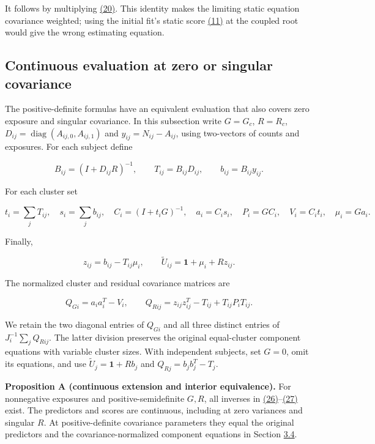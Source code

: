 \documentclass[11pt]{article}
\begin{document}
It follows by multiplying \hyperref[eq:20]{(20)}. This identity makes the limiting static equation covariance weighted; using the initial fit's static score \hyperref[eq:11]{(11)} at the coupled root would give the wrong estimating equation.

\subsection{Continuous evaluation at zero or singular covariance}\label{sec:3.5}

The positive-definite formulas have an equivalent evaluation that also covers zero exposure and singular covariance. In this subsection write \(G=G_c\), \(R=R_c\), \(D_{ij}=\operatorname{diag}(A_{ij,0},A_{ij,1})\) and \(y_{ij}=N_{ij}-A_{ij}\), using two-vectors of counts and exposures. For each subject define

\begin{equation*}
B_{ij}=(I+D_{ij}R)^{-1},\qquad
T_{ij}=B_{ij}D_{ij},\qquad b_{ij}=B_{ij}y_{ij}.
\tag{26}\label{eq:26}
\end{equation*}

For each cluster set

\begin{equation*}
t_i=\sum_jT_{ij},\quad s_i=\sum_jb_{ij},\quad
C_i=(I+t_iG)^{-1},\quad a_i=C_is_i,\quad
P_i=GC_i,\quad V_i=C_it_i,\quad \mu_i=Ga_i.
\tag{27}\label{eq:27}
\end{equation*}

Finally,

\begin{equation*}
z_{ij}=b_{ij}-T_{ij}\mu_i,\qquad
\widetilde U_{ij}=\mathbf1+\mu_i+Rz_{ij}.
\tag{28}\label{eq:28}
\end{equation*}

The normalized cluster and residual covariance matrices are

\begin{equation*}
Q_{Gi}=a_i a_i^T-V_i,\qquad
Q_{Rij}=z_{ij}z_{ij}^T-T_{ij}+T_{ij}P_iT_{ij}.
\tag{29}\label{eq:29}
\end{equation*}

We retain the two diagonal entries of \(Q_{Gi}\) and all three distinct entries of
\(J_i^{-1}\sum_jQ_{Rij}\). The latter division preserves the original equal-cluster component equations with variable cluster sizes. With independent subjects, set \(G=0\), omit its equations, and use \(\widetilde U_j=\mathbf1+Rb_j\) and \(Q_{Rj}=b_jb_j^T-T_j\).

\label{res:Proposition-A}
\textbf{Proposition A (continuous extension and interior equivalence).} For nonnegative exposures and positive-semidefinite \(G,R\), all inverses in \hyperref[eq:26]{(26)}--\hyperref[eq:27]{(27)} exist. The predictors and scores are continuous, including at zero variances and singular \(R\). At positive-definite covariance parameters they equal the original predictors and the covariance-normalized component equations in Section \hyperref[sec:3.4]{3.4}.
\end{document}
